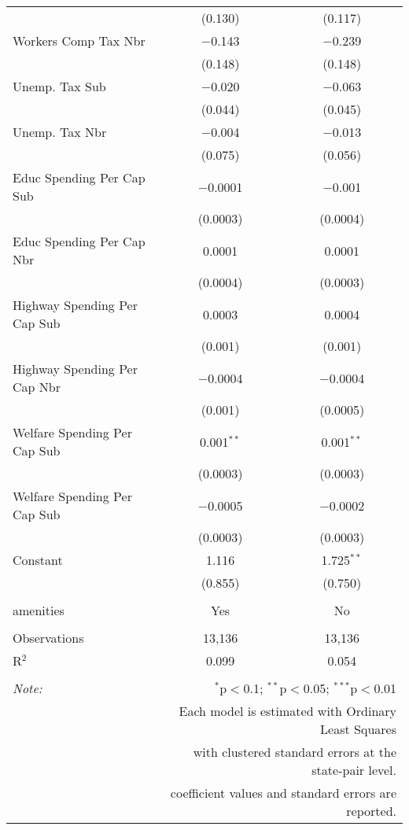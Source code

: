 \begin{table}[!htbp]
\begin{tabular}{@{\extracolsep{5pt}}lcc}
  & (0.130) & (0.117) \\ 
  Workers Comp Tax Nbr & $-$0.143 & $-$0.239 \\ 
  & (0.148) & (0.148) \\ 
  Unemp. Tax Sub & $-$0.020 & $-$0.063 \\ 
  & (0.044) & (0.045) \\ 
  Unemp. Tax Nbr & $-$0.004 & $-$0.013 \\ 
  & (0.075) & (0.056) \\ 
  Educ Spending Per Cap Sub & $-$0.0001 & $-$0.001 \\ 
  & (0.0003) & (0.0004) \\ 
  Educ Spending Per Cap Nbr & 0.0001 & 0.0001 \\ 
  & (0.0004) & (0.0003) \\ 
  Highway Spending Per Cap Sub & 0.0003 & 0.0004 \\ 
  & (0.001) & (0.001) \\ 
  Highway Spending Per Cap Nbr & $-$0.0004 & $-$0.0004 \\ 
  & (0.001) & (0.0005) \\ 
  Welfare Spending Per Cap Sub & 0.001$^{**}$ & 0.001$^{**}$ \\ 
  & (0.0003) & (0.0003) \\ 
  Welfare Spending Per Cap Sub & $-$0.0005 & $-$0.0002 \\ 
  & (0.0003) & (0.0003) \\ 
  Constant & 1.116 & 1.725$^{**}$ \\ 
  & (0.855) & (0.750) \\ 
 \hline \\[-1.8ex] 
amenities & Yes & No \\ 
\hline \\[-1.8ex] 
Observations & 13,136 & 13,136 \\ 
R$^{2}$ & 0.099 & 0.054 \\ 
\hline 
\hline \\[-1.8ex] 
\textit{Note:}  & \multicolumn{2}{r}{$^{*}$p$<$0.1; $^{**}$p$<$0.05; $^{***}$p$<$0.01} \\ 
 & \multicolumn{2}{r}{Each model is estimated with Ordinary Least Squares} \\ 
 & \multicolumn{2}{r}{with clustered standard errors at the state-pair level.} \\ 
 & \multicolumn{2}{r}{coefficient values and standard errors are reported.} \\ 
\end{tabular} 
\end{table} 

